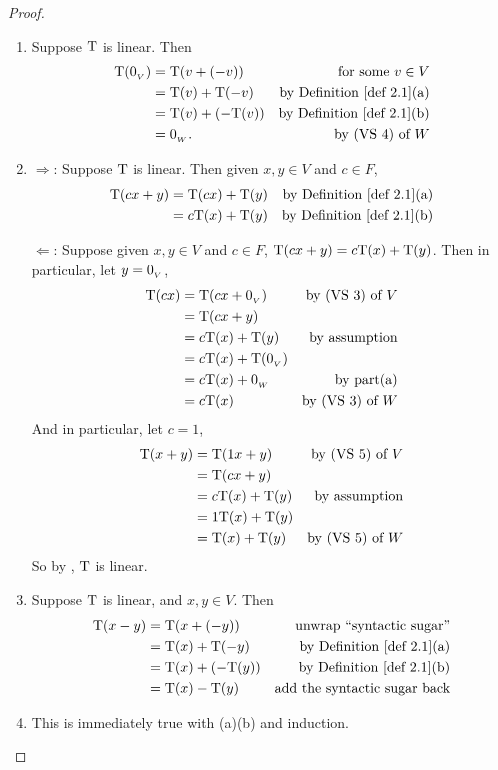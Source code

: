\begin{proof} \ 
\begin{enumerate}
\item
Suppose \(\mathrm{T}\) is linear.
Then
\begin{align*}
    \T(\OV) & = \T(v + (-v)) & \text{for some \(v \in V\)} \\
           & = \T(v) + \T(-v) & \text{by \DEF{2.1}(a)} \\
           & = \T(v) + (-\T(v)) & \text{by \DEF{2.1}(b)} \\
           & = \OW. & \text{by (VS 4) of \(W\)}
\end{align*}

\item
\(\Longrightarrow\): Suppose \(\mathrm{T}\) is linear.
Then given \(x, y \in V\) and \(c \in F\),
\begin{align*}
    \T(cx + y) & = \T(cx) + \T(y) & \text{by \DEF{2.1}(a)} \\
              & = c\T(x) + \T(y) & \text{by \DEF{2.1}(b)}
\end{align*}

\(\Longleftarrow\):
Suppose given \(x, y \in V\) and \(c \in F\), \(\mathrm{T}(cx + y) = c\mathrm{T}(x) + \mathrm{T}(y)\).
Then in particular, let \(y = 0_{_V}\),
\begin{align*}
    \mathrm{T}(cx) & = \mathrm{T}(cx + 0_{_V}) & \text{by (VS 3) of \(V\)} \\
           & = \mathrm{T}(cx + y) \\
           & = c\mathrm{T}(x) + \mathrm{T}(y) & \text{by assumption} \\
           & = c\mathrm{T}(x) + \mathrm{T}(0_{_V}) \\
           & = c\mathrm{T}(x) + 0_{_W} & \text{by part(a)} \\
           & = c\mathrm{T}(x) & \text{by (VS 3) of \(W\)}
\end{align*}
And in particular, let \(c = 1\),
\begin{align*}
    \mathrm{T}(x + y) & = \mathrm{T}(1x + y) & \text{by (VS 5) of \(V\)} \\
              & = \mathrm{T}(cx + y) \\
              & = c\mathrm{T}(x) + \mathrm{T}(y) & \text{by assumption} \\
              & = 1\mathrm{T}(x) + \mathrm{T}(y) \\
              & = \mathrm{T}(x) + \mathrm{T}(y) & \text{by (VS 5) of \(W\)}
\end{align*}
So by , \(\mathrm{T}\) is linear.

\item
Suppose \(\mathrm{T}\) is linear, and \(x, y \in V\).
Then
\begin{align*}
    \T(x - y) & = \T(x + (-y)) & \text{unwrap ``syntactic sugar''} \\
             & = \T(x) + \T(-y) & \text{by \DEF{2.1}(a)} \\
             & = \T(x) + (-\T(y)) & \text{by \DEF{2.1}(b)} \\
             & = \T(x) - \T(y) & \text{add the syntactic sugar back}
\end{align*}

\item
This is immediately true with (a)(b) and induction.
\end{enumerate}
\end{proof}

